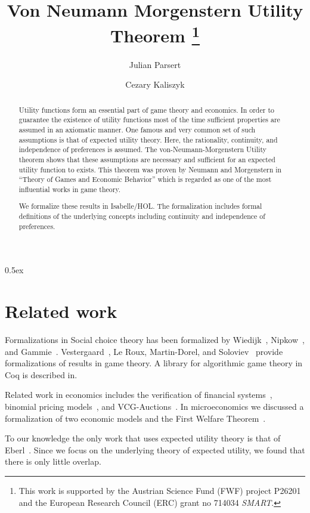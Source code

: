 \documentclass[11pt,a4paper]{article}
\begin{document}
\title{Von Neumann Morgenstern Utility Theorem \thanks{%
This work is supported by the Austrian Science Fund (FWF) project P26201 and the European Research Council (ERC) grant no 714034 \emph{SMART}.}}

\author{Julian Parsert \and Cezary Kaliszyk}

\maketitle

\begin{abstract}
Utility functions form an essential part of game theory and
economics. In order to guarantee the existence of utility
functions most of the time sufficient properties are assumed in an axiomatic manner.
One famous and very common set of such assumptions is that of expected utility theory.
Here, the rationality, continuity, and independence of preferences is assumed.
The von-Neumann-Morgenstern Utility theorem shows that these assumptions are necessary
and sufficient for an expected utility function to exists.
This theorem was proven by Neumann and Morgenstern in ``Theory of Games and Economic Behavior''
which is regarded as one of the most influential works in game theory.

We formalize these results in Isabelle/HOL. The formalization includes
formal definitions of the underlying concepts including continuity
and independence of preferences.
\end{abstract}

\tableofcontents

\parindent 0pt\parskip 0.5ex


\section{Related work}
Formalizations in Social choice theory has been formalized by
Wiedijk~\cite{Wiedijk2009},
Nipkow~\cite{DBLP:journals/afp/Nipkow08b}, and Gammie~\cite{SenSocialChoice:AFP,StableMatching:AFP}.
Vestergaard~\cite{DBLP:journals/ipl/Vestergaard06},
Le Roux, Martin-Dorel,
and Soloviev~\cite{DBLP:conf/tphol/Roux09,DBLP:journals/corr/abs-1709-02096} provide formalizations
of results in game theory.
A library for algorithmic game theory in Coq is described in\cite{JFR7235}.

Related work in economics includes the verification of financial
systems~\cite{passmoreInf}, binomial pricing
models~\cite{DBLP:conf/cade/EchenimP17},
and VCG-Auctions~\cite{kerber2013developing}. In
microeconomics we discussed a formalization of two economic models and
the First Welfare Theorem~\cite{Parsert:2018:FMF:3176245.3167100}.

To our knowledge the only work that uses expected utility theory is
that of Eberl~\cite{Randomised:Social:ChoiceAFP}.
Since we focus on the underlying theory of expected utility, we found that
there is only little overlap.



\end{document}
